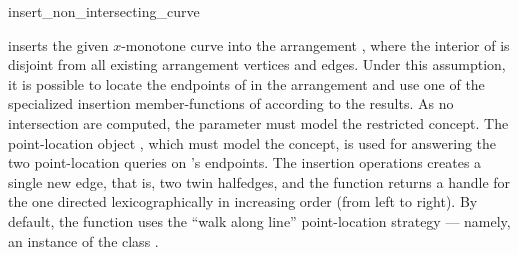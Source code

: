
\ccRefPageBegin

\begin{ccRefFunction}{insert_non_intersecting_curve}


   {inserts the given $x$-monotone curve  into the arrangement
    , where the interior of  is disjoint from all existing
    arrangement vertices and edges. Under this assumption, it is possible to
    locate the endpoints of  in the arrangement and use one of the
    specialized insertion member-functions of  according to the
    results. As no intersection are computed, the  parameter
    must model the restricted  concept.
    The point-location object , which must model the
     concept, is used for answering
    the two point-location queries on 's endpoints. The insertion
    operations creates a single new edge, that is, two twin halfedges,
    and the function returns a handle for the one directed
    lexicographically in increasing order (from left to right).
    By default, the function uses the ``walk along line'' point-location
    strategy --- namely, an instance of the class
    .
    }


\end{ccRefFunction}

\ccRefPageEnd
